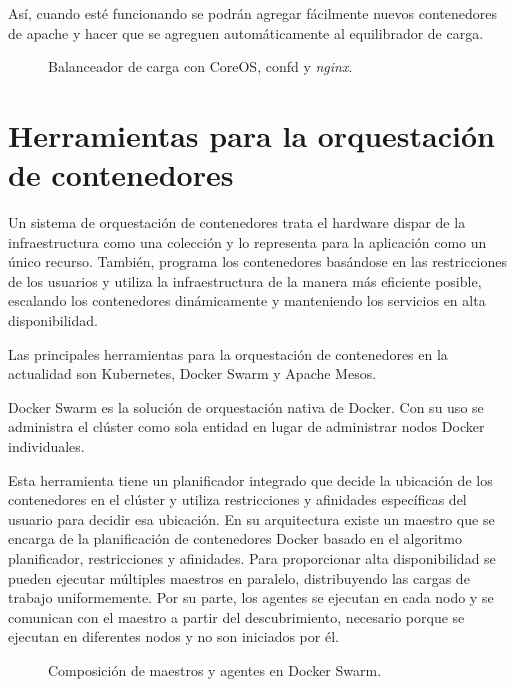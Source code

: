 Así, cuando esté funcionando se podrán agregar fácilmente nuevos contenedores de apache y hacer que se agreguen automáticamente al equilibrador de carga.

\begin{figure}[H]
\caption{Balanceador de carga con CoreOS, confd y \textit{nginx}.\label{fig:figure_placement_example}}
\end{figure}

\section{Herramientas para la orquestación de contenedores}

Un sistema de orquestación de contenedores trata el hardware dispar de la infraestructura como una colección y lo representa para la aplicación como un único recurso. También, programa los contenedores basándose en las restricciones de los usuarios y utiliza la infraestructura de la manera más eficiente posible, escalando los contenedores dinámicamente y manteniendo los servicios en alta disponibilidad.

Las principales herramientas para la orquestación de contenedores en la actualidad son Kubernetes, Docker Swarm y Apache Mesos.

Docker Swarm es la solución de orquestación nativa de Docker. Con su uso se administra el clúster como sola entidad en lugar de administrar nodos Docker individuales. 

Esta herramienta tiene un planificador integrado que decide la ubicación de los contenedores en el clúster y utiliza restricciones y afinidades específicas del usuario para decidir esa ubicación. En su arquitectura existe un maestro que se encarga de la planificación de contenedores Docker basado en el algoritmo planificador, restricciones y afinidades. Para proporcionar alta disponibilidad se pueden ejecutar múltiples maestros en paralelo, distribuyendo las cargas de trabajo uniformemente. Por su parte, los agentes se ejecutan en cada nodo y se comunican con el maestro a partir del descubrimiento, necesario porque se ejecutan en diferentes nodos y no son iniciados por él.

\begin{figure}[H]
\caption{Composición de maestros y agentes en Docker Swarm.\label{fig:figure_placement_example}}
\end{figure}
	
